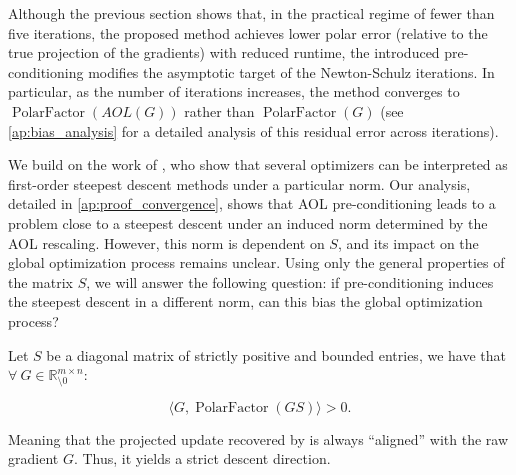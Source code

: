 Although the previous section shows that, in the practical regime of fewer than five iterations, the proposed method achieves lower polar error (relative to the true projection of the gradients) with reduced runtime, the introduced pre-conditioning modifies the asymptotic target of the Newton-Schulz iterations. In particular, as the number of iterations increases, the method converges to $\operatorname{PolarFactor}(AOL(G))$ rather than $\operatorname{PolarFactor}(G)$ (see \cref{ap:bias_analysis} for a detailed analysis of this residual error across iterations).

We build on the work of \citet{bernstein2024oldoptimizernewnorm}, who show that several optimizers can be interpreted as first-order steepest descent methods under a particular norm. Our analysis, detailed in \cref{ap:proof_convergence}, shows that AOL pre-conditioning leads to a problem close to a steepest descent under 
an induced norm determined by the AOL rescaling.
However, this norm is dependent on $S$, and its impact on the global optimization process remains unclear. Using only the general properties of the matrix $S$, we will answer the following question: if pre-conditioning induces the steepest descent in a different norm, can this bias the global optimization process?


        \begin{lemma}
        \label{lem:alignment}
            Let $S$ be a diagonal matrix of strictly positive and bounded entries, we have that $\forall \ G \in \mathbb{R}^{m \times n}_{\setminus 0}$:
        
            \begin{equation}
                \langle G, \operatorname{PolarFactor}(GS) \rangle > 0.
            \end{equation}
        
            \noindent Meaning that the projected update recovered by \turbomuon is always ``aligned'' with the raw gradient $G$. Thus, it yields a strict descent direction.
        \end{lemma}
        
